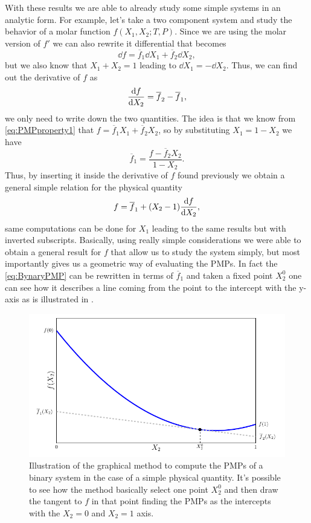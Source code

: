\ex{}
{
    With these results we are able to already study some simple systems in an analytic form. For example, let's take a two component system and study the behavior of a molar function $f(X_1, X_2; T, P)$. Since we are using the molar version of $f'$ we can also rewrite it differential that becomes
    \begin{equation}
        \dd f  = \overline{f}_1 \dd X_1 + \overline{f}_2 \dd X_2,
    \end{equation}
    but we also know that $X_1 + X_2 = 1$ leading to $\dd X_1 = -\dd X_2$. Thus, we can find out the derivative of $f$ as
    \begin{equation}
        \dv{f}{X_2} = \overline{f}_2 - \overline{f}_1,
    \end{equation}
    we only need to write down the two quantities.  The idea is that we know from \eqref{eq:PMPproperty1} that $f = \overline{f}_1 X_1 + \overline{f}_2 X_2$, so by substituting $X_1 = 1 - X_2$ we have
    \begin{equation}
        \overline{f}_1 = \frac{f - \overline{f}_2X_2}{1 - X_2}.
    \end{equation}
    Thus, by inserting it inside the derivative of $f$ found previously we obtain a general simple relation for the physical quantity
    \begin{equation}
        \label{eq:BynaryPMP}
        f = \overline{f}_1 + (X_2 - 1)\dv{f}{X_2},
    \end{equation}
    same computations can be done for $X_1$ leading to the same results but with inverted subscripts. Basically, using really simple considerations we were able to obtain a general result for $f$ that allow us to study the system simply, but most importantly gives us a geometric way of evaluating the PMPs. In fact the \eqref{eq:BynaryPMP} can be rewritten in terms of $\overline{f}_1$ and taken a fixed point $X_2^0$ one can see how it describes a line coming from the point to the intercept with the y-axis as is illustrated in .
}

\begin{figure}[t]
    \centering
    \includegraphics[width=0.8\linewidth]{Immagini/PMPs.pdf}
    \caption{
        Illustration of the graphical method to compute the PMPs of a binary system in the case of a simple physical quantity. It's possible to see how the method basically select one point $X_2^0$ and then draw the tangent to $f$ in that point finding the PMPs as the intercepts with the $X_2 = 0$ and $X_2 = 1$ axis.
    }
    \label{fig:PMPs}
\end{figure}

